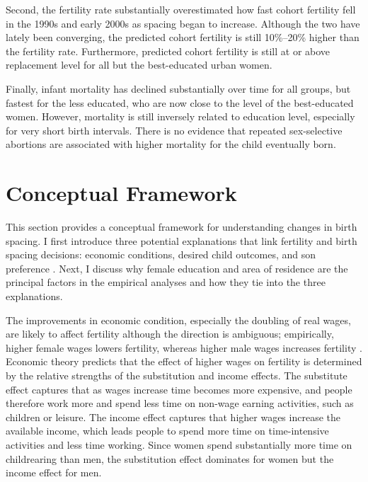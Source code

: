 \documentclass[12pt,letterpaper]{article}
\begin{document}
Second, the fertility rate substantially overestimated how fast cohort fertility fell in the 
1990s and early 2000s as spacing began to increase. 
Although the two have lately been converging, the predicted cohort fertility is still 
10\%--20\% higher than the fertility rate. 
Furthermore, predicted cohort fertility is still at or above replacement level for all but 
the best-educated urban women. 

Finally, infant mortality has declined substantially over time for all groups, but fastest 
for the less educated, who are now close to the level of the best-educated women. 
However, mortality is still inversely related to education level, especially for very short 
birth intervals. 
There is no evidence that repeated sex-selective abortions are associated with higher 
mortality for the child eventually born.


\section{Conceptual Framework}

This section provides a conceptual framework for understanding changes in birth spacing.
I first introduce three potential explanations that link fertility and birth 
spacing decisions: economic conditions, desired child outcomes, and son preference 
\citep{Casterline2016,Portner2018}.
Next, I discuss why female education and area of residence are the principal factors 
in the empirical analyses and how they tie into the three explanations.

The improvements in economic condition, especially the doubling of real wages,
are likely to affect fertility although the direction is ambiguous; empirically, 
higher female wages lowers fertility, whereas higher male wages increases fertility 
\citep{Hotz1997,schultz97}.
Economic theory predicts that the effect of higher wages on fertility is determined by 
the relative strengths of the substitution and income effects.
The substitute effect captures that as wages increase time becomes more expensive, and
people therefore work more and spend less time on non-wage earning activities, such as 
children or leisure.
The income effect captures that higher wages increase the available income, which
leads people to spend more time on time-intensive activities and less time working.
Since women spend substantially more time on childrearing than men, the substitution effect 
dominates for women but the income effect for men.
\end{document}
